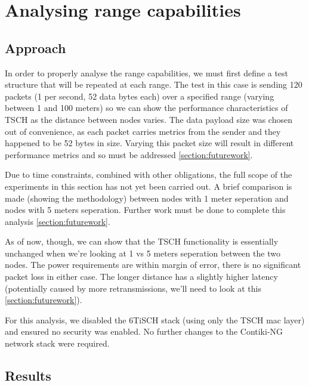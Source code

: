 \documentclass[conference]{IEEEtran}
\begin{document}
%
%

\section{Analysing range capabilities}
\label{section:task3}

\subsection{Approach} 

In order to properly analyse the range capabilities, we must first define a test structure that will be repeated at each range. The test in this case is sending 120 packets (1 per second, 52 data bytes each) over a specified range (varying between 1 and 100 meters) so we can show the performance characteristics of TSCH as the distance between nodes varies. The data payload size was chosen out of convenience, as each packet carries metrics from the sender and they happened to be 52 bytes in size. Varying this packet size will result in different performance metrics and so must be addressed \ref{section:futurework}. 

Due to time constraints, combined with other obligations, the full scope of the experiments in this section has not yet been carried out. A brief comparison is made (showing the methodology) between nodes with 1 meter seperation and nodes with 5 meters seperation. Further work must be done to complete this analysis \ref{section:futurework}.

As of now, though, we can show that the TSCH functionality is essentially unchanged when we're looking at 1 vs 5 meters seperation between the two nodes. The power requirements are within margin of error, there is no significant packet loss in either case. The longer distance has a slightly higher latency (potentially caused by more retransmissions, we'll need to look at this \ref{section:futurework}).

For this analysis, we disabled the 6TiSCH stack (using only the TSCH mac layer) and ensured no security was enabled. No further changes to the Contiki-NG network stack were required. 

\subsection{Results}
\end{document}
